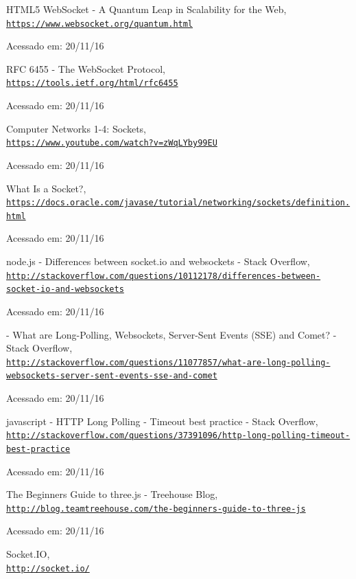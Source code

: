 \documentclass[a4paper,12pt]{article}
\begin{document}
\begin{thebibliography}{50}
HTML5 WebSocket - A Quantum Leap in Scalability for the Web,
\\\texttt{\url{https://www.websocket.org/quantum.html}}

Acessado em: 20/11/16


RFC 6455 - The WebSocket Protocol,
\\\texttt{\url{https://tools.ietf.org/html/rfc6455}}

Acessado em: 20/11/16


Computer Networks 1-4: Sockets,
\\\texttt{\url{https://www.youtube.com/watch?v=zWqLYby99EU}}

Acessado em: 20/11/16


What Is a Socket?,
\\\texttt{\url{https://docs.oracle.com/javase/tutorial/networking/sockets/definition.html}}

Acessado em: 20/11/16


node.js - Differences between socket.io and websockets - Stack Overflow,
\\\texttt{\url{http://stackoverflow.com/questions/10112178/differences-between-socket-io-and-websockets}}

Acessado em: 20/11/16


 - What are Long-Polling, Websockets, Server-Sent Events (SSE) and Comet? - Stack Overflow,
\\\texttt{\url{http://stackoverflow.com/questions/11077857/what-are-long-polling-websockets-server-sent-events-sse-and-comet}}

Acessado em: 20/11/16


javascript - HTTP Long Polling - Timeout best practice - Stack Overflow,
\\\texttt{\url{http://stackoverflow.com/questions/37391096/http-long-polling-timeout-best-practice}}

Acessado em: 20/11/16


The Beginners Guide to three.js - Treehouse Blog,
\\\texttt{\url{http://blog.teamtreehouse.com/the-beginners-guide-to-three-js}}

Acessado em: 20/11/16


Socket.IO,
\\\texttt{\url{http://socket.io/}}


\end{thebibliography}
\end{document}
